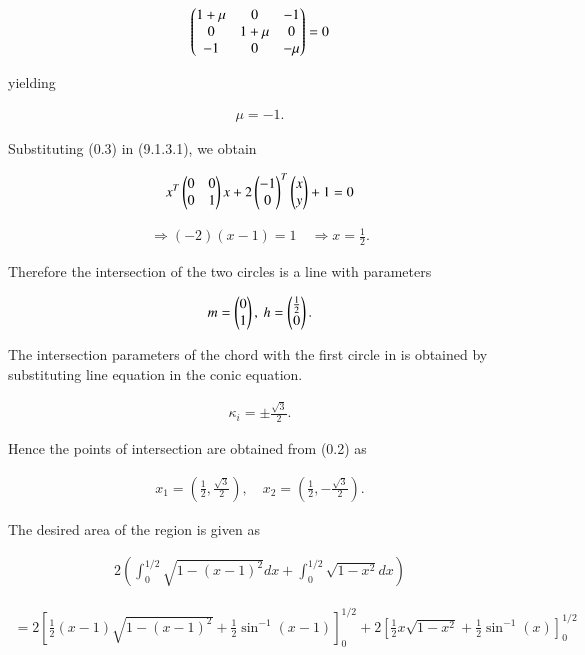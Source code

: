 \documentclass[journal]{IEEEtran}
\begin{document}
 \begin{align}
\begin{pmatrix}1 + \mu & 0 & -1 \\ 0 & 1 + \mu & 0 \\ -1 & 0 & -\mu\end{pmatrix} = 0 
 \end{align}

yielding

 \begin{align}
\mu = -1.
 \end{align}

Substituting (0.3) in (9.1.3.1), we obtain

 \begin{align}
x^T \begin{pmatrix} 0 & 0 \\ 0 & 1\end{pmatrix} x + 2 \begin{pmatrix} -1 \\ 0\end{pmatrix}^T \begin{pmatrix} x \\ y\end{pmatrix} + 1 = 0
 \end{align}

 \begin{align}
\Rightarrow (-2)(x-1) = 1 \quad \Rightarrow x = \frac{1}{2}. 
 \end{align}

Therefore the intersection of the two circles is a line with parameters

 \begin{align}
m = \begin{pmatrix}0 \\ 1\end{pmatrix}, \ h = \begin{pmatrix}\frac{1}{2} \\ 0\end{pmatrix}. 
 \end{align}

The intersection parameters of the chord with the first circle in is obtained by substituting line equation in the conic equation.

 \begin{align}
\kappa_i = \pm \frac{\sqrt{3}}{2}. 
 \end{align}

Hence the points of intersection are obtained from (0.2) as

 \begin{align}
x_1 = \left( \frac{1}{2}, \frac{\sqrt{3}}{2} \right), \quad x_2 = \left( \frac{1}{2}, -\frac{\sqrt{3}}{2} \right). 
 \end{align}

The desired area of the region is given as

 \begin{align}
2 \left( \int_0^{1/2} \sqrt{1 - (x - 1)^2} dx + \int_0^{1/2} \sqrt{1 - x^2} dx \right)
 \end{align}

 \begin{align}
= 2 \left[ \frac{1}{2} \left( x - 1 \right) \sqrt{1 - (x - 1)^2} + \frac{1}{2} \sin^{-1}(x - 1) \right]_0^{1/2} + 2 \left[ \frac{1}{2} x \sqrt{1 - x^2} + \frac{1}{2} \sin^{-1}(x) \right]_0^{1/2}
 \end{align}
\end{document}
